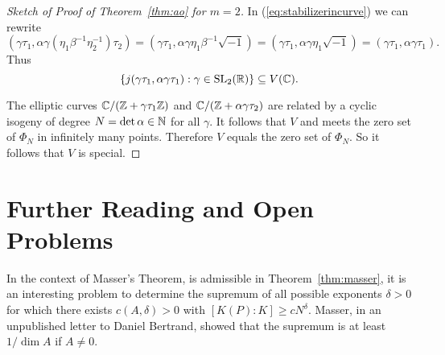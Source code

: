 \begin{proof}[Sketch of Proof of Theorem~\ref{thm:ao} for $m=2$]
  In (\ref{eq:stabilizerincurve})  we can rewrite
  \begin{equation*}
    (\gamma \tau_1, \alpha \gamma(\eta_1
    \beta^{-1}\eta_2^{-1})\tau_2) =
    (\gamma\tau_1,\alpha\gamma \eta_1\beta^{-1}\sqrt{-1})
    =
        (\gamma\tau_1,\alpha\gamma \eta_1\sqrt{-1})=
    (\gamma\tau_1, \alpha \gamma\tau_1).
  \end{equation*}
  Thus
  $$    \{j(\gamma\tau_1,\alpha\gamma\tau_1) : \gamma \in \mathrm{SL}_2({\mathbb{R}})\}
  \subseteq V({\mathbb{C}}). $$
  
  The elliptic curves ${\mathbb{C}}/({\mathbb{Z}}+\gamma\tau_1{\mathbb{Z}})$ and
  ${\mathbb{C}}/({\mathbb{Z}}+\alpha\gamma\tau_2)$ are related by a cyclic isogeny of degree
  $N=\det\alpha\in{\mathbb{N}}$ for all $\gamma$. It follows that $V$ and meets
  the zero set of $\Phi_N$ in infinitely many points. Therefore $V$
  equals the zero set of $\Phi_N$.   So it follows that $V$ is special.
\end{proof}
\section{Further Reading and Open Problems}

In the context of Masser's Theorem, is admissible in
Theorem~\ref{thm:masser}, it is an interesting problem to determine
the supremum of all possible exponents $\delta>0$ for which there
exists $c(A,\delta)>0$ with $[K(P):K]\ge c N^{\delta}$. Masser, in an
unpublished letter to Daniel Bertrand, showed that the supremum is at
least $1/\dim A$ if $A\not=0$. 


